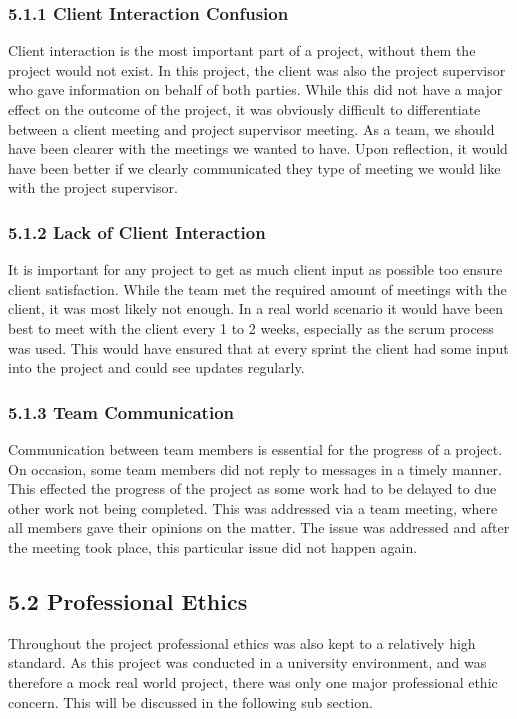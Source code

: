 \documentclass[11pt]{article}
\begin{document}
\begin{adjustwidth}{1cm}{}

\subsubsection{5.1.1 Client Interaction Confusion}
Client interaction is the most important part of a project, without them the project would not exist. In this project, the client was also the project supervisor who gave information on behalf of both parties. While this did not have a major effect on the outcome of the project, it was obviously difficult to differentiate between a client meeting and project supervisor meeting. As a team, we should have been clearer with the meetings we wanted to have. Upon reflection, it would have been better if we clearly communicated they type of meeting we would like with the project supervisor. 

\subsubsection{5.1.2 Lack of Client Interaction}
It is important for any project to get as much client input as possible too ensure client satisfaction. While the team met the required amount of meetings with the client, it was most likely not enough. In a real world scenario it would have been best to meet with the client every 1 to 2 weeks, especially as the scrum process was used. This would have ensured that at every sprint the client had some input into the project and could see updates regularly. 

\subsubsection{5.1.3 Team Communication}
Communication between team members is essential for the progress of a project. On occasion, some team members did not reply to messages in a timely manner. This effected the progress of the project as some work had to be delayed to due other work not being completed. This was addressed via a team meeting, where all members gave their opinions on the matter. The issue was addressed and after the meeting took place, this particular issue did not happen again.

\end{adjustwidth}

\subsection{5.2 Professional Ethics}
Throughout the project professional ethics was also kept to a relatively high standard. As this project was conducted in a university environment, and was therefore a mock real world project, there was only one major professional ethic concern. This will be discussed in the following sub section.
\end{document}
